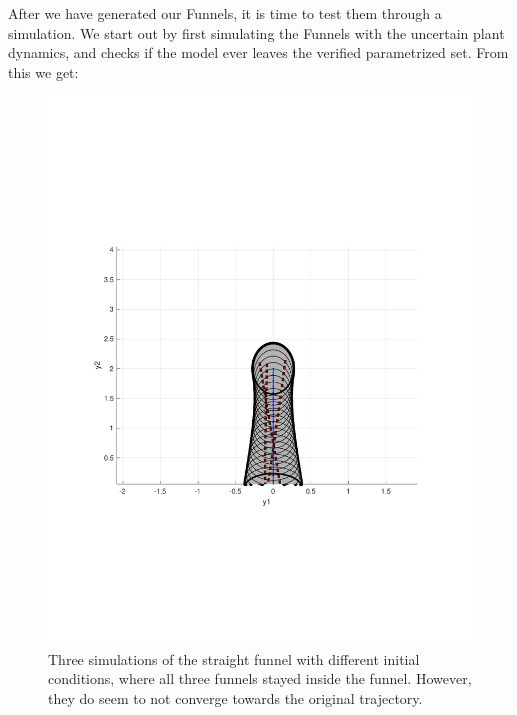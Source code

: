 After we have generated our Funnels, it is time to test them through a
simulation. We start out by first simulating the Funnels with the uncertain
plant dynamics, and checks if the model ever leaves the verified parametrized
set. From this we get:

\begin{figure}
  \includegraphics[scale=0.5]{figures/funnel/straight_simulation}
  \caption{Three simulations of the straight funnel with different initial
    conditions, where all three funnels stayed inside the funnel. However, they
    do seem to not converge towards the original trajectory.}
\end{figure}


